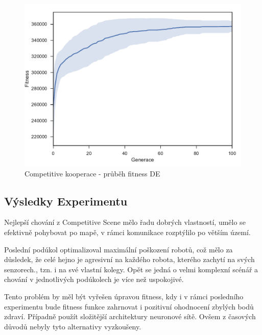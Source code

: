 \begin{figure}[p]\centering
	\includegraphics[width=\columnwidth]{../img/CompetitiveMap/CoopAgresive}
	\caption{Competitive kooperace - průběh fitness DE}
	\label{obr04:CompetitiveCoopAgresive}
\end{figure}
\clearpage
\subsection*{Výsledky Experimentu}
 Nejlepší chování z Competitive Scene mělo řadu dobrých vlastností, umělo se efektivně pohybovat po mapě, v rámci komunikace rozptýlilo po větším území. \par
 Poslední  podúkol optimalizoval maximální poškození robotů, což mělo za důsledek, že celé hejno je agresivní na každého robota, kterého zachytí na svých senzorech., tzn. i na své vlastní kolegy. Opět se jedná o velmi komplexní scénář a chování v jednotlivých podúkolech je více než uspokojivé.\par
Tento problém by měl být vyřešen úpravou fitness, kdy i v rámci posledního experimentu bude fitness funkce zahrnovat i pozitivní ohodnocení zbylých bodů zdraví. Případně použít složitější architektury neuronové sítě.  Ovšem z časových důvodů nebyly tyto alternativy vyzkoušeny. 
\par
 
